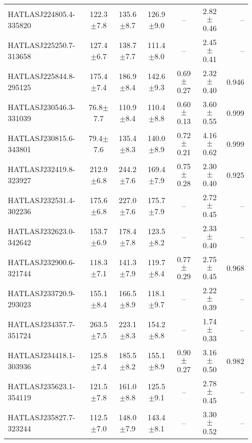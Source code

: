 \begin{landscape}
\begin{longtable}[h!]{lcccccr}
    HATLASJ224805.4-335820 & 122.3$\pm$7.8 & 135.6$\pm$8.7 & 126.9$\pm$9.0 & -- & 2.82$\pm$0.46 & -- \\
    HATLASJ225250.7-313658 & 127.4$\pm$6.7 & 138.7$\pm$7.7 & 111.4$\pm$8.0 & -- & 2.45$\pm$0.41 & -- \\
    HATLASJ225844.8-295125 & 175.4$\pm$7.4 & 186.9$\pm$8.4 & 142.6$\pm$9.3 & 0.69$\pm$0.27 & 2.32$\pm$0.40 & 0.946 \\
    HATLASJ230546.3-331039 & 76.8$\pm$7.7 & 110.9$\pm$8.4 & 110.4$\pm$8.8 & 0.60$\pm$0.13 & 3.60$\pm$0.55 & 0.999 \\
    HATLASJ230815.6-343801 & 79.4$\pm$7.6 & 135.4$\pm$8.3 & 140.0$\pm$8.9 & 0.72$\pm$0.21 & 4.16$\pm$0.62 & 0.999 \\
    HATLASJ232419.8-323927 & 212.9$\pm$6.8 & 244.2$\pm$7.6 & 169.4$\pm$7.9 & 0.75$\pm$0.28 & 2.30$\pm$0.40 & 0.925 \\
    HATLASJ232531.4-302236 & 175.6$\pm$6.8 & 227.0$\pm$7.6 & 175.7$\pm$7.9 & -- & 2.72$\pm$0.45 & -- \\
    HATLASJ232623.0-342642 & 153.7$\pm$6.9 & 178.4$\pm$7.8 & 123.5$\pm$8.2 & -- & 2.33$\pm$0.40 & -- \\
    HATLASJ232900.6-321744 & 118.3$\pm$7.1 & 141.3$\pm$7.9 & 119.7$\pm$8.4 & 0.77$\pm$0.29 & 2.75$\pm$0.45 & 0.968 \\
    HATLASJ233720.9-293023 & 155.1$\pm$8.4 & 166.5$\pm$8.9 & 118.1$\pm$9.7 & -- & 2.22$\pm$0.39 & -- \\
    HATLASJ234357.7-351724 & 263.5$\pm$7.5 & 223.1$\pm$8.3 & 154.2$\pm$8.8 & -- & 1.74$\pm$0.33 & -- \\
    HATLASJ234418.1-303936 & 125.8$\pm$7.4 & 185.5$\pm$8.2 & 155.1$\pm$8.9 & 0.90$\pm$0.27 & 3.16$\pm$0.50 & 0.982 \\
    HATLASJ235623.1-354119 & 121.5$\pm$7.8 & 161.0$\pm$8.8 & 125.5$\pm$9.1 & -- & 2.78$\pm$0.45 & -- \\
    HATLASJ235827.7-323244 & 112.5$\pm$7.0 & 148.0$\pm$7.9 & 143.4$\pm$8.1 & -- & 3.30$\pm$0.52 & -- \\
    \hline
\end{longtable}
\end{landscape}
